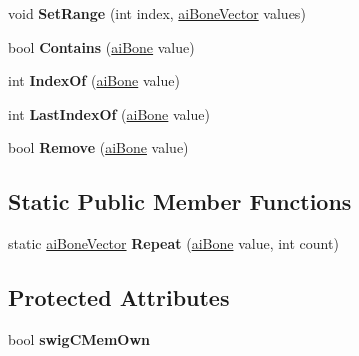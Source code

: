 \begin{DoxyCompactItemize}
\item 
\hypertarget{classai_bone_vector_a7f369d117e403130784ed103e6816587}{void {\bfseries Set\+Range} (int index, \hyperlink{classai_bone_vector}{ai\+Bone\+Vector} values)}\label{classai_bone_vector_a7f369d117e403130784ed103e6816587}

\item 
\hypertarget{classai_bone_vector_aefba3a1f142c5154ca6198a17d622669}{bool {\bfseries Contains} (\hyperlink{structai_bone}{ai\+Bone} value)}\label{classai_bone_vector_aefba3a1f142c5154ca6198a17d622669}

\item 
\hypertarget{classai_bone_vector_a5ed2179d5bd8b61d462dc385994c696c}{int {\bfseries Index\+Of} (\hyperlink{structai_bone}{ai\+Bone} value)}\label{classai_bone_vector_a5ed2179d5bd8b61d462dc385994c696c}

\item 
\hypertarget{classai_bone_vector_ad4e44f33d7da2efca7bc26eae9fa305b}{int {\bfseries Last\+Index\+Of} (\hyperlink{structai_bone}{ai\+Bone} value)}\label{classai_bone_vector_ad4e44f33d7da2efca7bc26eae9fa305b}

\item 
\hypertarget{classai_bone_vector_a2afa29b401308950d04ed2f232e29248}{bool {\bfseries Remove} (\hyperlink{structai_bone}{ai\+Bone} value)}\label{classai_bone_vector_a2afa29b401308950d04ed2f232e29248}

\end{DoxyCompactItemize}
\subsection*{Static Public Member Functions}
\begin{DoxyCompactItemize}
\item 
\hypertarget{classai_bone_vector_ad3c0e9d6ffa95fe46b949da8dc51a1d8}{static \hyperlink{classai_bone_vector}{ai\+Bone\+Vector} {\bfseries Repeat} (\hyperlink{structai_bone}{ai\+Bone} value, int count)}\label{classai_bone_vector_ad3c0e9d6ffa95fe46b949da8dc51a1d8}

\end{DoxyCompactItemize}
\subsection*{Protected Attributes}
\begin{DoxyCompactItemize}
\item 
\hypertarget{classai_bone_vector_a1a802c79312741d387faaf2d833e095d}{bool {\bfseries swig\+C\+Mem\+Own}}\label{classai_bone_vector_a1a802c79312741d387faaf2d833e095d}

\end{DoxyCompactItemize}

